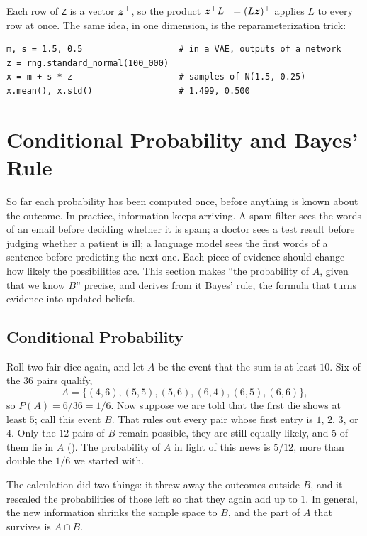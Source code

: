Each row of \texttt{Z} is a vector $\bm{z}^\top$, so the product
$\bm{z}^\top L^\top = (L\bm{z})^\top$ applies $L$ to every row at
once. The same idea, in one dimension, is the reparameterization trick:

\begin{lstlisting}
m, s = 1.5, 0.5                   # in a VAE, outputs of a network
z = rng.standard_normal(100_000)
x = m + s * z                     # samples of N(1.5, 0.25)
x.mean(), x.std()                 # 1.499, 0.500
\end{lstlisting}

\section{Conditional Probability and Bayes' Rule}
\label{sec:ch05-bayes}

So far each probability has been computed once, before anything is
known about the outcome. In practice, information keeps arriving. A
spam filter sees the words of an email before deciding whether it is
spam; a doctor sees a test result before judging whether a patient is
ill; a language model sees the first words of a sentence before
predicting the next one. Each piece of evidence should change how
likely the possibilities are. This section makes ``the probability of
$A$, given that we know $B$'' precise, and derives from it Bayes' rule,
the formula that turns evidence into updated beliefs.

\subsection{Conditional Probability}
\label{sec:ch05-conditional}

Roll two fair dice again, and let $A$ be the event that the sum is at
least $10$. Six of the $36$ pairs qualify,
\[
  A = \{(4, 6), (5, 5), (5, 6), (6, 4), (6, 5), (6, 6)\},
\]
so $P(A) = 6/36 = 1/6$. Now suppose we are told that the first die shows
at least $5$; call this event $B$. That rules out every pair whose first
entry is $1$, $2$, $3$, or $4$. Only the $12$ pairs of $B$ remain
possible, they are still equally likely, and $5$ of them lie in $A$
(). The probability of $A$ in light of this
news is $5/12$, more than double the $1/6$ we started with.

The calculation did two things: it threw away the outcomes outside $B$,
and it rescaled the probabilities of those left so that they again add
up to $1$. In general, the new information shrinks the sample space to
$B$, and the part of $A$ that survives is $A \cap B$.

